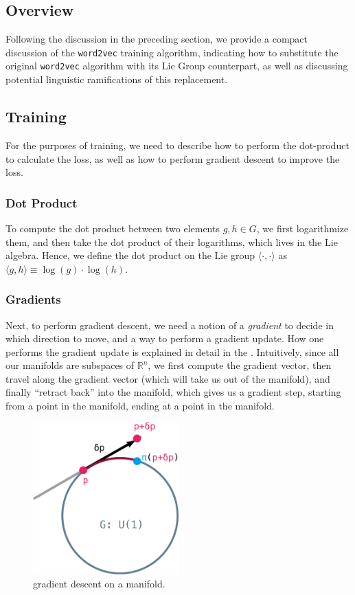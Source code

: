 \documentclass[11pt]{book}
\begin{document}
\subsection{Overview}

Following the discussion in the preceding section, we provide a compact discussion of the \texttt{word2vec}
training algorithm, indicating how to substitute the original \texttt{word2vec} algorithm with
its Lie Group counterpart, as well as discussing potential linguistic ramifications of this replacement.

\subsection{Training}

For the purposes of training, we need to describe how to perform the dot-product to calculate the loss,
as well as how to perform gradient descent to improve the loss. 

\subsubsection{Dot Product}  To compute the dot product between two elements $g, h \in G$, we first logarithmize
them, and then take the dot product of their logarithms, which lives in the Lie algebra.
Hence, we define the dot product on the Lie group $\langle \cdot , \cdot \rangle$ as
$\langle g, h \rangle \equiv \log(g) \cdot \log(h)$.


\subsubsection{Gradients} Next, to perform gradient descent, we need
a notion of a \emph{gradient} to decide in which direction to move, and a way to perform a gradient update.
How one performs the gradient update is explained in detail in the \label{section:optim-on-riem}. Intuitively,
since all our manifolds are subspaces of $\mathbb R^n$, we first compute the gradient vector, then travel
along the gradient vector (which will take us out of the manifold), and finally ``retract back'' into the
manifold, which gives us a gradient step, starting from a point in the manifold, ending at a point in the manifold.

\begin{figure}[htb]
\includegraphics[width=0.5\textwidth]{./gradient-manifold.pdf}
\caption{gradient descent on a manifold.}
\end{figure}
\end{document}
